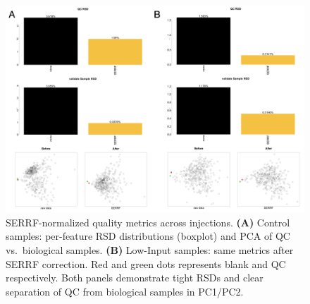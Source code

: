 \documentclass[10pt,letterpaper]{article}
\begin{document}
\begin{figure}[htp]
  \centering
  \includegraphics[width=\textwidth]{fig/supp/SuppFig2.png}
  \caption{
    SERRF-normalized quality metrics across injections. 
    {\bf(A)} Control samples: per-feature RSD distributions (boxplot) and PCA of QC vs.\ biological samples. 
    {\bf(B)} Low-Input samples: same metrics after SERRF correction. 
    Red and green dots represents blank and QC respectively. Both panels demonstrate tight RSDs and clear separation of QC from biological samples in PC1/PC2.
  }
  \label{fig:S2}
\end{figure}
\end{document}
